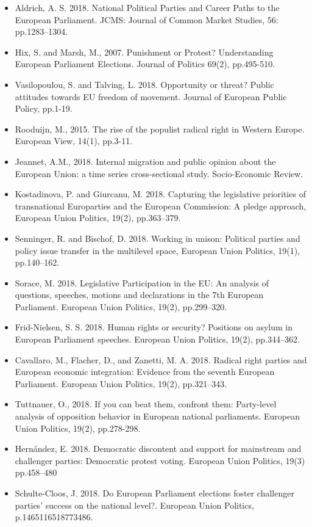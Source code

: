 \begin{itemize}
	\item Aldrich, A. S. 2018. National Political Parties and Career Paths to the European Parliament. JCMS: Journal of Common Market Studies, 56: pp.1283–1304.
	\item Hix, S. and Marsh, M., 2007. Punishment or Protest? Understanding European Parliament Elections. Journal of Politics 69(2), pp.495-510.
	\item Vasilopoulou, S. and Talving, L. 2018. Opportunity or threat? Public attitudes towards EU freedom of movement. Journal of European Public Policy, pp.1-19.
	\item Rooduijn, M., 2015. The rise of the populist radical right in Western Europe. European View, 14(1), pp.3-11.
	\item Jeannet, A.M., 2018. Internal migration and public opinion about the European Union: a time series cross-sectional study. Socio-Economic Review.
	\item Kostadinova, P. and Giurcanu, M. 2018. Capturing the legislative priorities of transnational Europarties and the European Commission: A pledge approach, European Union Politics, 19(2), pp.363–379.
	\item Senninger, R. and Bischof, D. 2018. Working in unison: Political parties and policy issue transfer in the multilevel space, European Union Politics, 19(1), pp.140–162.
	\item Sorace, M. 2018. Legislative Participation in the EU: An analysis of questions, speeches, motions and declarations in the 7th European Parliament. European Union Politics, 19(2), pp.299–320.
	\item Frid-Nielsen, S. S. 2018. Human rights or security? Positions on asylum in European Parliament speeches. European Union Politics, 19(2), pp.344–362.
	\item Cavallaro, M., Flacher, D., and Zanetti, M. A. 2018. Radical right parties and European economic integration: Evidence from the seventh European Parliament. European Union Politics, 19(2), pp.321–343.
	\item Tuttnauer, O., 2018. If you can beat them, confront them: Party-level analysis of opposition behavior in European national parliaments. European Union Politics, 19(2), pp.278-298.
	\item Hernández, E. 2018. Democratic discontent and support for mainstream and challenger parties: Democratic protest voting. European Union Politics, 19(3) pp.458–480
	\item Schulte-Cloos, J. 2018. Do European Parliament elections foster challenger parties' success on the national level?. European Union Politics, p.1465116518773486.

\end{itemize}
